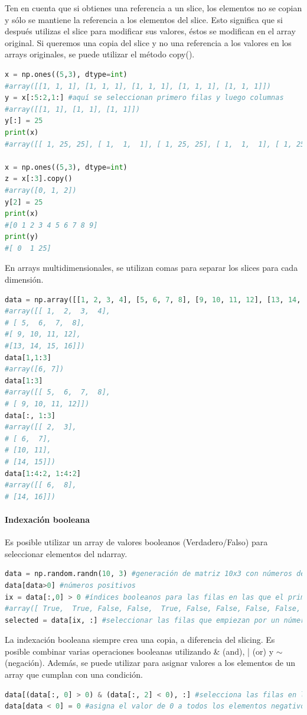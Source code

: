 Ten en cuenta que si obtienes una referencia a un slice, los elementos no se copian y sólo se mantiene la referencia a los elementos del slice. Esto significa que si después utilizas el slice para modificar sus valores, éstos se modifican en el array original. Si queremos una copia del slice y no una referencia a los valores en los arrays originales, se puede utilizar el método copy().
\begin{lstlisting}[language=Python]
x = np.ones((5,3), dtype=int)
#array([[1, 1, 1], [1, 1, 1], [1, 1, 1], [1, 1, 1], [1, 1, 1]])
y = x[:5:2,1:] #aquí se seleccionan primero filas y luego columnas
#array([[1, 1], [1, 1], [1, 1]])
y[:] = 25
print(x)
#array([[ 1, 25, 25], [ 1,  1,  1], [ 1, 25, 25], [ 1,  1,  1], [ 1, 25, 25]])

x = np.ones((5,3), dtype=int)
z = x[:3].copy()
#array([0, 1, 2])
y[2] = 25
print(x)
#[0 1 2 3 4 5 6 7 8 9]
print(y)
#[ 0  1 25]
\end{lstlisting}

En arrays multidimensionales, se utilizan comas para separar los slices para cada dimensión.
\begin{lstlisting}[language=Python]
data = np.array([[1, 2, 3, 4], [5, 6, 7, 8], [9, 10, 11, 12], [13, 14, 15, 16]])
#array([[ 1,  2,  3,  4], 
# [ 5,  6,  7,  8], 
#[ 9, 10, 11, 12], 
#[13, 14, 15, 16]])
data[1,1:3]
#array([6, 7])
data[1:3]
#array([[ 5,  6,  7,  8], 
# [ 9, 10, 11, 12]])
data[:, 1:3]
#array([[ 2,  3],
# [ 6,  7],
# [10, 11],
# [14, 15]])
data[1:4:2, 1:4:2]
#array([[ 6,  8],
# [14, 16]])
\end{lstlisting}

\paragraph{Indexación booleana}
Es posible utilizar un array de valores booleanos (Verdadero/Falso) para seleccionar elementos del ndarray.
\begin{lstlisting}[language=Python]
data = np.random.randn(10, 3) #generación de matriz 10x3 con números de distribución normal
data[data>0] #números positivos
ix = data[:,0] > 0 #índices booleanos para las filas en las que el primer elemento es positivo
#array([ True,  True, False, False,  True, False, False, False, False, True])
selected = data[ix, :] #seleccionar las filas que empiezan por un número positivo
\end{lstlisting}

La indexación booleana siempre crea una copia, a diferencia del slicing. Es posible combinar varias operaciones booleanas utilizando \& (and), | (or) y $\sim$ (negación). Además, se puede utilizar para asignar valores a los elementos de un array que cumplan con una condición.
\begin{lstlisting}[language=Python]
data[(data[:, 0] > 0) & (data[:, 2] < 0), :] #selecciona las filas en las que el primer elemento es positivo y el último negativo
data[data < 0] = 0 #asigna el valor de 0 a todos los elementos negativos
\end{lstlisting}


